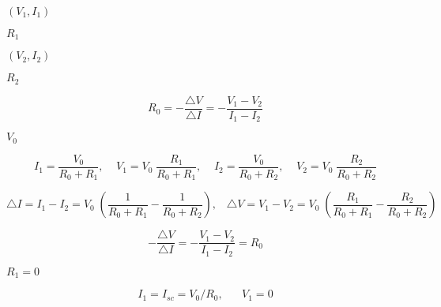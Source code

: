 {\newpage\clearpage
{}%
$(V_1, I_1)$%
\lthtmlinlinemathZ
\lthtmlcheckvsize\clearpage}

{\newpage\clearpage
{}%
$R_1$%
\lthtmlinlinemathZ
\lthtmlcheckvsize\clearpage}

{\newpage\clearpage
{}%
$(V_2, I_2)$%
\lthtmlinlinemathZ
\lthtmlcheckvsize\clearpage}

{\newpage\clearpage
{}%
$R_2$%
\lthtmlinlinemathZ
\lthtmlcheckvsize\clearpage}

{\newpage\clearpage
{}%
\begin{displaymath} R_0=-\frac{\triangle V}{\triangle I}=-\frac{V_1-V_2}{I_1-I_2} \end{displaymath}%
\lthtmldisplayZ
\lthtmlcheckvsize\clearpage}

{\newpage\clearpage
{}%
$V_0$%
\lthtmlinlinemathZ
\lthtmlcheckvsize\clearpage}

{\newpage\clearpage
{}%
\begin{displaymath} I_1=\frac{V_0}{R_0+R_1},\;\;\;\;V_1=V_0\;\frac{R_1}{R_0+R_1},\;\;\;\;
   I_2=\frac{V_0}{R_0+R_2},\;\;\;\;V_2=V_0\;\frac{R_2}{R_0+R_2} \end{displaymath}%
\lthtmldisplayZ
\lthtmlcheckvsize\clearpage}

{\newpage\clearpage
{}%
\begin{displaymath} 
\triangle I=I_1-I_2=V_0\;\left(\frac{1}{R_0+R_1}-\frac{1}{R_0+R_2}\right),
\;\;\;   \triangle V=V_1-V_2=V_0\;\left(\frac{R_1}{R_0+R_1}-\frac{R_2}{R_0+R_2}\right)
\end{displaymath}%
\lthtmldisplayZ
\lthtmlcheckvsize\clearpage}

{\newpage\clearpage
{}%
\begin{displaymath} -\frac{\triangle V}{\triangle I}=-\frac{V_1-V_2}{I_1-I_2}=R_0 \end{displaymath}%
\lthtmldisplayZ
\lthtmlcheckvsize\clearpage}

{\newpage\clearpage
{}%
$R_1=0$%
\lthtmlinlinemathZ
\lthtmlcheckvsize\clearpage}

{\newpage\clearpage
{}%
\begin{displaymath} I_1=I_{sc}=V_0/R_0,\;\;\;\;\;\; V_1=0 \end{displaymath}%
\lthtmldisplayZ
\lthtmlcheckvsize\clearpage}

